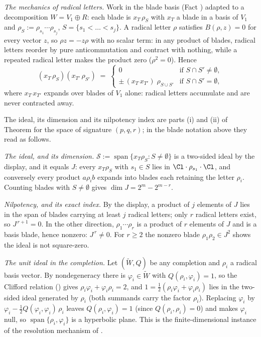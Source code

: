 \emph{The mechanics of radical letters.} Work in the blade basis (Fact ) adapted to a decomposition $W = V_1 \oplus R$: each blade is $x_T\, \rho_S$ with $x_T$ a blade in a basis of $V_1$ and $\rho_S := \rho_{s_1} \cdots \rho_{s_j}$, $S = \{s_1 < \dots < s_j\}$. A radical letter $\rho$ satisfies $B(\rho, z) = 0$ for every vector $z$, so $\rho z = -z\rho$ with no scalar term: in any product of blades, radical letters reorder by pure anticommutation and contract with nothing, while a repeated radical letter makes the product zero ($\rho^2 = 0$). Hence
\[
(x_T\, \rho_S)(x_{T'}\, \rho_{S'}) \;=\;
\begin{cases}
0 & \text{if } S \cap S' \neq \emptyset, \\
\pm\, (x_T\, x_{T'})\; \rho_{S \cup S'} & \text{if } S \cap S' = \emptyset ,
\end{cases}
\]
where $x_T\, x_{T'}$ expands over blades of $V_1$ alone: radical letters accumulate and are never contracted away.

The ideal, its dimension and its nilpotency index are parts (i) and (ii) of Theorem  for the space of signature $(p, q, r)$; in the blade notation above they read as follows.

\emph{The ideal, and its dimension.} $\mathcal{S} := \operatorname{span}\{x_T \rho_S : S \neq \emptyset\}$ is a two-sided ideal by the display, and it equals $J$: every $x_T \rho_S$ with $s_1 \in S$ lies in $\Cl \cdot \rho_{s_1} \cdot \Cl$, and conversely every product $a \rho_i b$ expands into blades each retaining the letter $\rho_i$. Counting blades with $S \neq \emptyset$ gives $\dim J = 2^m - 2^{m-r}$.

\emph{Nilpotency, and its exact index.} By the display, a product of $j$ elements of $J$ lies in the span of blades carrying at least $j$ radical letters; only $r$ radical letters exist, so $J^{\,r+1} = 0$. In the other direction, $\rho_1 \cdots \rho_r$ is a product of $r$ elements of $J$ and is a basis blade, hence nonzero: $J^{\,r} \neq 0$. For $r \geq 2$ the nonzero blade $\rho_1 \rho_2 \in J^2$ shows the ideal is not square-zero.

\emph{The unit ideal in the completion.} Let $(\widetilde W, Q)$ be any completion and $\rho_i$ a radical basis vector. By nondegeneracy there is $\varphi_i \in \widetilde W$ with $Q(\rho_i, \varphi_i) = 1$, so the Clifford relation () gives $\rho_i \varphi_i + \varphi_i \rho_i = 2$, and $1 = \tfrac12(\rho_i \varphi_i + \varphi_i \rho_i)$ lies in the two-sided ideal generated by $\rho_i$ (both summands carry the factor $\rho_i$). Replacing $\varphi_i$ by $\varphi_i - \tfrac12 Q(\varphi_i, \varphi_i)\, \rho_i$ leaves $Q(\rho_i, \varphi_i) = 1$ (since $Q(\rho_i, \rho_i) = 0$) and makes $\varphi_i$ null, so $\operatorname{span}\{\rho_i, \varphi_i\}$ is a hyperbolic plane. This is the finite-dimensional instance of the resolution mechanism of \cite[Prop.~3.4]{ButlerT4}.
